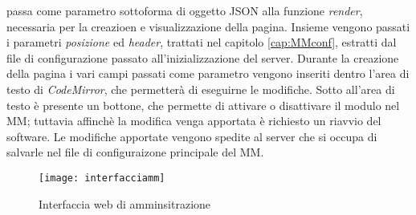 passa come parametro sottoforma di oggetto JSON alla funzione \textit{render}, necessaria per la creazioen e visualizzazione della pagina.
Insieme vengono passati i parametri \textit{posizione} ed \textit{header}, trattati nel capitolo \ref{cap:MMconf}, estratti dal file
di configurazione passato all'inizializzazione del server.
Durante la creazione della pagina i vari campi passati come parametro vengono inseriti dentro l'area di testo di \textit{CodeMirror}, che permetter\`a di eseguirne
le modifiche. Sotto all'area di testo \`e presente un bottone, che permette di attivare o disattivare il modulo nel MM; tuttavia affinch\`e la modifica
venga apportata \`e richiesto un riavvio del software. Le modifiche apportate vengono spedite al server che si occupa di salvarle nel file di configuraizone
principale del MM.

\begin{figure}[H]
    \texttt{[image: interfacciamm]}
    \caption{Interfaccia web di amminsitrazione}
    \label{fig:interfaccia}
\end{figure}
